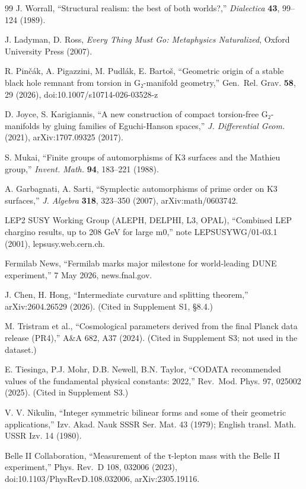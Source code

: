 \begin{thebibliography}{99}
 J. Worrall, ``Structural realism: the best of both worlds?,'' \emph{Dialectica} \textbf{43}, 99--124 (1989).

 J. Ladyman, D. Ross, \emph{Every Thing Must Go: Metaphysics Naturalized}, Oxford University Press (2007).

 R. Pinčák, A. Pigazzini, M. Pudlák, E. Bartoš, ``Geometric origin of a stable black hole remnant from torsion in G₂-manifold geometry,'' Gen.~Rel. Grav. \textbf{58}, 29 (2026), doi:10.1007/s10714-026-03528-z

 D. Joyce, S. Karigiannis, ``A new construction of compact torsion-free G₂-manifolds by gluing families of Eguchi-Hanson spaces,'' \emph{J. Differential Geom.} (2021), arXiv:1707.09325 (2017).

 S. Mukai, ``Finite groups of automorphisms of K3 surfaces and the Mathieu group,'' \emph{Invent. Math.} \textbf{94}, 183--221 (1988).

 A. Garbagnati, A. Sarti, ``Symplectic automorphisms of prime order on K3 surfaces,'' \emph{J. Algebra} \textbf{318}, 323--350 (2007), arXiv:math/0603742.

 LEP2 SUSY Working Group (ALEPH, DELPHI, L3, OPAL), ``Combined LEP chargino results, up to 208 GeV for large m0,'' note LEPSUSYWG/01-03.1 (2001), lepsusy.web.cern.ch.

 Fermilab News, ``Fermilab marks major milestone for world-leading DUNE experiment,'' 7 May 2026, news.fnal.gov.

 J. Chen, H. Hong, ``Intermediate curvature and splitting theorem,'' arXiv:2604.26529 (2026). (Cited in Supplement S1, §8.4.)

 M. Tristram et al., ``Cosmological parameters derived from the final Planck data release (PR4),'' A\&A 682, A37 (2024). (Cited in Supplement S3; not used in the dataset.)

 E. Tiesinga, P.J. Mohr, D.B. Newell, B.N. Taylor, ``CODATA recommended values of the fundamental physical constants: 2022,'' Rev.~Mod. Phys. 97, 025002 (2025). (Cited in Supplement S3.)

 V. V. Nikulin, ``Integer symmetric bilinear forms and some of their geometric applications,'' Izv. Akad. Nauk SSSR Ser. Mat. 43 (1979); English transl. Math. USSR Izv. 14 (1980).

 Belle II Collaboration, ``Measurement of the τ-lepton mass with the Belle II experiment,'' Phys. Rev.~D 108, 032006 (2023), doi:10.1103/PhysRevD.108.032006, arXiv:2305.19116.


\end{thebibliography}
